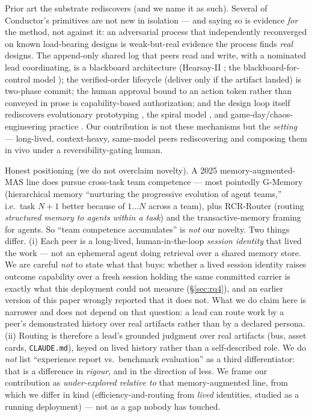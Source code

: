 \documentclass[10pt,conference]{IEEEtran}   %
\begin{document}
Prior art the substrate rediscovers (and we name it as such). Several of Conductor's
primitives are not new in isolation --- and saying so is evidence \emph{for} the method, not against
it: an adversarial process that independently reconverged on known load-bearing designs is
weak-but-real evidence the process finds \emph{real} designs. The append-only shared log that peers
read and write, with a nominated lead coordinating, is a blackboard architecture
(Hearsay-II \cite{hearsay2}; the blackboard-for-control model \cite{blackboard}); the verified-order
lifecycle (deliver only if the artifact landed) is two-phase commit; the human approval
bound to an action token rather than conveyed in prose is capability-based authorization; and the
design loop itself rediscovers evolutionary prototyping \cite{floyd1984,davis1992}, the spiral
model \cite{boehm1988}, and game-day/chaos-engineering practice \cite{basiri2016}.
Our contribution is not these mechanisms but the \emph{setting} --- long-lived, context-heavy,
same-model peers rediscovering and composing them in vivo under a reversibility-gating human.

Honest positioning (we do not overclaim novelty). A 2025
memory-augmented-MAS line does pursue cross-task team competence --- most pointedly
G-Memory \cite{gmemory} (hierarchical memory ``nurturing the progressive evolution
of agent teams,'' i.e.\ task $N{+}1$ better because of $1{\dots}N$ across a team), plus
RCR-Router \cite{rcrrouter} (routing \emph{structured memory to agents within a
task}) and the transactive-memory framing for agents. So ``team competence
accumulates'' is \emph{not} our novelty. Two things differ. (i) Each peer is a
long-lived, human-in-the-loop \emph{session identity} that lived the work --- not an
ephemeral agent doing retrieval over a shared memory store. We are careful \emph{not} to state what that
buys: whether a lived session identity raises outcome capability over a fresh session holding the
same committed carrier is exactly what this deployment could not measure
(\S\ref{sec:rq4}), and an earlier version of this paper wrongly reported that it does not. What we
do claim here is narrower and does not depend on that question: a lead can route work by a peer's
demonstrated history over real artifacts rather than by a declared persona. (ii) Routing is
therefore a lead's grounded judgment over real artifacts (bus, asset cards,
\texttt{CLAUDE.md}), keyed on lived history rather than a self-described role. We do \emph{not} list
``experience report vs.\ benchmark evaluation'' as a third differentiator: that is a difference in
\emph{rigour}, and in the direction of less. We frame our contribution as \emph{under-explored
relative to} that memory-augmented line, from which we differ in kind (efficiency-and-routing from
\emph{lived} identities, studied as a running deployment) --- not as a gap nobody has touched.
\end{document}
